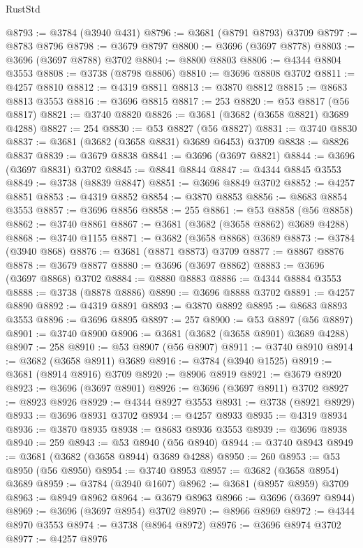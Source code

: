\begin{lexlean}{RustStd}
\begin{coremodule}
@8793 := @3784 (@3940 @431)
@8796 := @3681 (@8791 @8793) @3709
@8797 := @8783 @8796
@8798 := @3679 @8797
@8800 := @3696 (@3697 @8778)
@8803 := @3696 (@3697 @8788) @3702
@8804 := @8800 @8803
@8806 := @4344 @8804 @3553
@8808 := @3738 (@8798 @8806)
@8810 := @3696 @8808 @3702
@8811 := @4257 @8810
@8812 := @4319 @8811
@8813 := @3870 @8812
@8815 := @8683 @8813 @3553
@8816 := @3696 @8815
@8817 := 253
@8820 := @53 @8817 (@56 @8817)
@8821 := @3740 @8820
@8826 := @3681 (@3682 (@3658 @8821) @3689 @4288)
@8827 := 254
@8830 := @53 @8827 (@56 @8827)
@8831 := @3740 @8830
@8837 := @3681 (@3682 (@3658 @8831) @3689 @6453) @3709
@8838 := @8826 @8837
@8839 := @3679 @8838
@8841 := @3696 (@3697 @8821)
@8844 := @3696 (@3697 @8831) @3702
@8845 := @8841 @8844
@8847 := @4344 @8845 @3553
@8849 := @3738 (@8839 @8847)
@8851 := @3696 @8849 @3702
@8852 := @4257 @8851
@8853 := @4319 @8852
@8854 := @3870 @8853
@8856 := @8683 @8854 @3553
@8857 := @3696 @8856
@8858 := 255
@8861 := @53 @8858 (@56 @8858)
@8862 := @3740 @8861
@8867 := @3681 (@3682 (@3658 @8862) @3689 @4288)
@8868 := @3740 @1155
@8871 := @3682 (@3658 @8868) @3689
@8873 := @3784 (@3940 @868)
@8876 := @3681 (@8871 @8873) @3709
@8877 := @8867 @8876
@8878 := @3679 @8877
@8880 := @3696 (@3697 @8862)
@8883 := @3696 (@3697 @8868) @3702
@8884 := @8880 @8883
@8886 := @4344 @8884 @3553
@8888 := @3738 (@8878 @8886)
@8890 := @3696 @8888 @3702
@8891 := @4257 @8890
@8892 := @4319 @8891
@8893 := @3870 @8892
@8895 := @8683 @8893 @3553
@8896 := @3696 @8895
@8897 := 257
@8900 := @53 @8897 (@56 @8897)
@8901 := @3740 @8900
@8906 := @3681 (@3682 (@3658 @8901) @3689 @4288)
@8907 := 258
@8910 := @53 @8907 (@56 @8907)
@8911 := @3740 @8910
@8914 := @3682 (@3658 @8911) @3689
@8916 := @3784 (@3940 @1525)
@8919 := @3681 (@8914 @8916) @3709
@8920 := @8906 @8919
@8921 := @3679 @8920
@8923 := @3696 (@3697 @8901)
@8926 := @3696 (@3697 @8911) @3702
@8927 := @8923 @8926
@8929 := @4344 @8927 @3553
@8931 := @3738 (@8921 @8929)
@8933 := @3696 @8931 @3702
@8934 := @4257 @8933
@8935 := @4319 @8934
@8936 := @3870 @8935
@8938 := @8683 @8936 @3553
@8939 := @3696 @8938
@8940 := 259
@8943 := @53 @8940 (@56 @8940)
@8944 := @3740 @8943
@8949 := @3681 (@3682 (@3658 @8944) @3689 @4288)
@8950 := 260
@8953 := @53 @8950 (@56 @8950)
@8954 := @3740 @8953
@8957 := @3682 (@3658 @8954) @3689
@8959 := @3784 (@3940 @1607)
@8962 := @3681 (@8957 @8959) @3709
@8963 := @8949 @8962
@8964 := @3679 @8963
@8966 := @3696 (@3697 @8944)
@8969 := @3696 (@3697 @8954) @3702
@8970 := @8966 @8969
@8972 := @4344 @8970 @3553
@8974 := @3738 (@8964 @8972)
@8976 := @3696 @8974 @3702
@8977 := @4257 @8976

\end{coremodule}
\end{lexlean}

